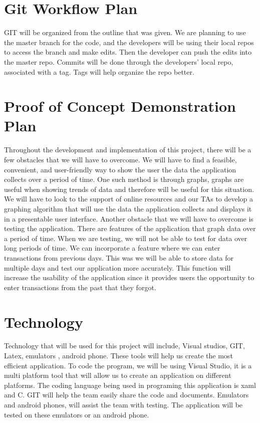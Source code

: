 \documentclass{article}
\begin{document}
\section{Git Workflow Plan}
GIT will be organized from the outline that was given. We are planning to use the master branch for the code, and the developers will be using their local repos to access the branch and make edits. Then the developer can push the edits into the master repo. Commits will be done through the developers’ local repo, associated with a tag. Tags will help organize the repo better.

\section{Proof of Concept Demonstration Plan}
Throughout the development and implementation of this project, there will be a few obstacles that we will have to overcome. We will have to find a feasible, convenient, and user-friendly way to show the user the data the application collects over a period of time. One such method is through graphs, graphs are useful when showing trends of data and therefore will be useful for this situation. We will have to look to the support of online resources and our TAs to develop a graphing algorithm that will use the data the application collects and displays it in a presentable user interface. Another obstacle that we will have to overcome is testing the application. There are features of the application that graph data over a period of time. When we are testing, we will not be able to test for data over long periods of time. We can incorporate a feature where we can enter transactions from previous days. This was we will be able to store data for multiple days and test our application more accurately. This function will increase the usability of the application since it provides users the opportunity to enter transactions from the past that they forgot.

\section{Technology}
Technology that will be used for this project will include, Visual studios, GIT, Latex, emulators , android phone. These tools will help us create the most efficient application. To code the program, we will be using Visual Studio, it is a multi platform tool that will allow us to create an application on different platforms. The coding language being used in programing this application is xaml and C. GIT will help the team easily share the code and documents. Emulators and android phones, will assist the team with testing. The application will be tested on these emulators or an android phone.
\end{document}
